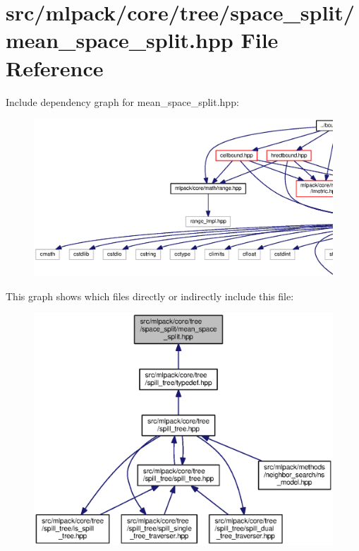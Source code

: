 \section{src/mlpack/core/tree/space\+\_\+split/mean\+\_\+space\+\_\+split.hpp File Reference}
\label{mean__space__split_8hpp}
Include dependency graph for mean\+\_\+space\+\_\+split.\+hpp\+:
\nopagebreak
\begin{figure}[H]
\begin{center}
\leavevmode
\includegraphics[width=350pt]{mean__space__split_8hpp__incl}
\end{center}
\end{figure}
This graph shows which files directly or indirectly include this file\+:
\nopagebreak
\begin{figure}[H]
\begin{center}
\leavevmode
\includegraphics[width=350pt]{mean__space__split_8hpp__dep__incl}
\end{center}
\end{figure}
